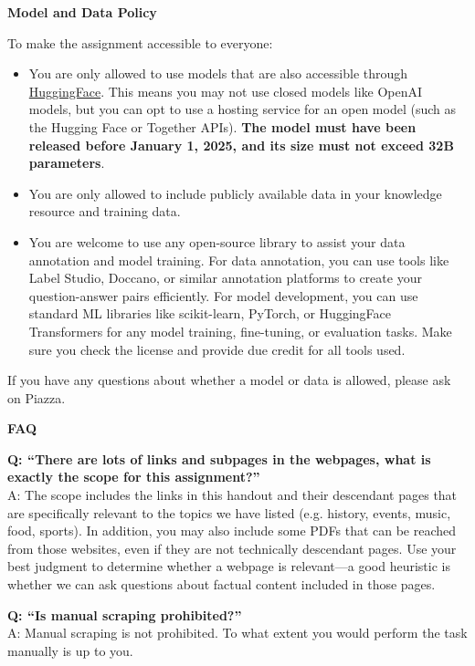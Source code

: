 \documentclass[11pt]{article}
\newcommand{\problem}[1]{%
  \vspace{1em}
  \noindent\colorbox{headerblue}{\parbox{\dimexpr\textwidth-2\fboxsep}{%
    \vspace{2pt}\textbf{\large #1}\vspace{2pt}}}
  \vspace{0.6em}
}
\begin{document}
\problem{Model and Data Policy}

\noindent To make the assignment accessible to everyone:

\begin{itemize}[leftmargin=2em]
  \item You are only allowed to use models that are also accessible through
    \href{https://huggingface.co/models}{HuggingFace}. This means you may not use closed models like
    OpenAI models, but you can opt to use a hosting service for an open model (such as the Hugging
    Face or Together APIs). \textbf{The model must have been released before January 1, 2025, and its
    size must not exceed 32B parameters}.
  \item You are only allowed to include publicly available data in your knowledge resource and
    training data.
  \item You are welcome to use any open-source library to assist your data annotation and model
    training. For data annotation, you can use tools like Label Studio, Doccano, or similar annotation
    platforms to create your question-answer pairs efficiently. For model development, you can use
    standard ML libraries like scikit-learn, PyTorch, or HuggingFace Transformers for any model
    training, fine-tuning, or evaluation tasks. Make sure you check the license and provide due credit
    for all tools used.
\end{itemize}

\noindent If you have any questions about whether a model or data is allowed, please ask on Piazza.

\problem{FAQ}

\noindent\textbf{Q: ``There are lots of links and subpages in the webpages, what is exactly the scope
for this assignment?''}\\
A: The scope includes the links in this handout and their descendant pages that are specifically
relevant to the topics we have listed (e.g. history, events, music, food, sports). In addition, you
may also include some PDFs that can be reached from those websites, even if they are not technically
descendant pages. Use your best judgment to determine whether a webpage is relevant---a good heuristic
is whether we can ask questions about factual content included in those pages.

\vspace{0.6em}
\noindent\textbf{Q: ``Is manual scraping prohibited?''}\\
A: Manual scraping is not prohibited. To what extent you would perform the task manually is up to you.
\end{document}
